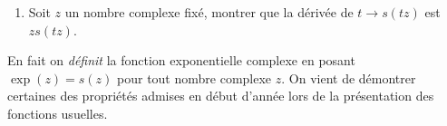 \begin{enumerate}
\begin{enumerate}
    \item En d{\'e}duire
\[
\forall (z,z^{\prime })\in \C^{2},\quad s(z+z^{\prime})=s(z)s(z^{\prime })
\]
  \end{enumerate}

  \item Soit $z$ un nombre complexe fix{\'e}, montrer que la d{\'e}riv{\'e}e de
$t\rightarrow s(tz)$ est $zs(tz)$.
\end{enumerate}


En fait on \emph{d{\'e}finit} la fonction exponentielle complexe
en posant $\exp (z)=s(z)$ pour tout nombre complexe $z$. On vient
de d{\'e}montrer certaines des propri{\'e}t{\'e}s admises en
d{\'e}but d'ann{\'e}e lors de la pr{\'e}sentation des fonctions
usuelles.
